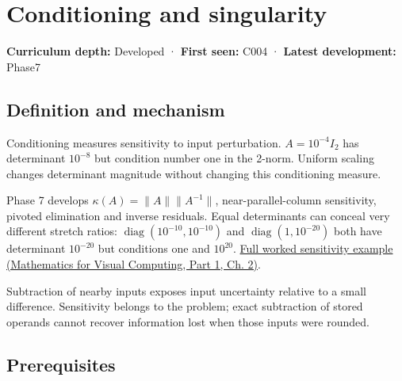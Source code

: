 \hypertarget{appendix-8f6a01f284a7}{}\label{referencestart:appendix-8f6a01f284a7}
\section{Conditioning and singularity}\label{appendix-8f6a01f284a7-conditioning-and-singularity}

\hypertarget{appendix-8f6a01f284a7-conditioning-and-singularity}{}

\textbf{Curriculum depth:} Developed · \textbf{First seen:} C004 · \textbf{Latest development:} Phase7

\begin{allmightroledefinition}

\subsection{Definition and mechanism}\label{appendix-8f6a01f284a7-definition-and-mechanism}

\hypertarget{appendix-8f6a01f284a7-definition-and-mechanism}{}

Conditioning measures sensitivity to input perturbation. \(A=10^{-4}I_2\) has determinant \(10^{-8}\) but condition number one in the 2-norm. Uniform scaling changes determinant magnitude without changing this conditioning measure.

\end{allmightroledefinition}

Phase 7 develops \(\kappa(A)=\|A\|\|A^{-1}\|\), near-parallel-column sensitivity, pivoted elimination and inverse residuals. Equal determinants can conceal very different stretch ratios: \(\operatorname{diag}(10^{-10},10^{-10})\) and \(\operatorname{diag}(1,10^{-20})\) both have determinant \(10^{-20}\) but conditions one and \(10^{20}\). \href{../02-Mathematics-for-Visual-Computing-P01/main.pdf\#nameddest=01-foundations-i-ch018-an-inverse-can-exist-and-still-amplify-uncertainty}{Full worked sensitivity example (Mathematics for Visual Computing, Part 1, Ch. 2)}.

Subtraction of nearby inputs exposes input uncertainty relative to a small difference. Sensitivity belongs to the problem; exact subtraction of stored operands cannot recover information lost when those inputs were rounded.

\subsection{Prerequisites}\label{appendix-8f6a01f284a7-prerequisites}

